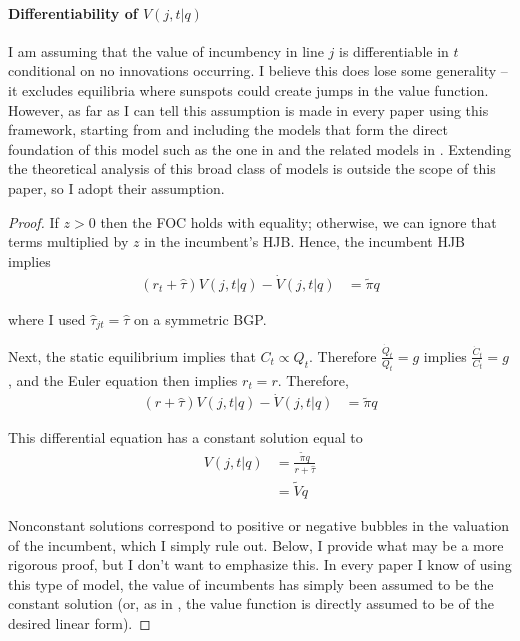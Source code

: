 \documentclass[11pt,english]{article}
\begin{document}
\paragraph{Differentiability of $V(j,t|q)$}

I am assuming that the value of incumbency in line $j$ is differentiable in $t$ conditional on no innovations occurring. I believe this does lose some generality -- it excludes equilibria where sunspots could create jumps in the value function. However, as far as I can tell this assumption is made in every paper using this framework, starting from \cite{grossman_quality_1991} and including the models that form the direct foundation of this model such as the one in \cite{acemoglu_innovation_2015} and the related models in \cite{acemoglu_introduction_2009}. Extending the theoretical analysis of this broad class of models is outside the scope of this paper, so I adopt their assumption. 

\begin{proof}
	If $z > 0$ then the FOC holds with equality; otherwise, we can ignore that terms multiplied by $z$ in the incumbent's HJB. Hence, the incumbent HJB implies
	\begin{align}
	(r_t + \hat{\tau}) V(j,t|q) - \dot{V}(j,t|q) &= \tilde{\pi} q
	\end{align}
	
	where I used $\hat{\tau}_{jt} = \hat{\tau}$ on a symmetric BGP.
	
	Next, the static equilibrium implies that $C_t \propto Q_t$. Therefore $\frac{\dot{Q}_t}{Q_t} = g$ implies $\frac{\dot{C}_t}{C_t} = g$, and the Euler equation then implies $r_t = r$. Therefore, 
	\begin{align}
	(r + \hat{\tau}) V(j,t|q) - \dot{V}(j,t|q) &= \tilde{\pi} q
	\end{align}
	
	This differential equation has a constant solution equal to 
	\begin{align}
	V(j,t|q) &= \frac{\tilde{\pi} q}{r + \hat{\tau}} \\
	&= \tilde{V} q 
	\end{align}
	
	Nonconstant solutions correspond to positive or negative bubbles in the valuation of the incumbent, which I simply rule out. Below, I provide what may be a more rigorous proof, but I don't want to emphasize this. In every paper I know of using this type of model, the value of incumbents has simply been assumed to be the constant solution (or, as in \cite{acemoglu_innovation_2015}, the value function is directly assumed to be of the desired linear form).
\end{proof}
\end{document}
